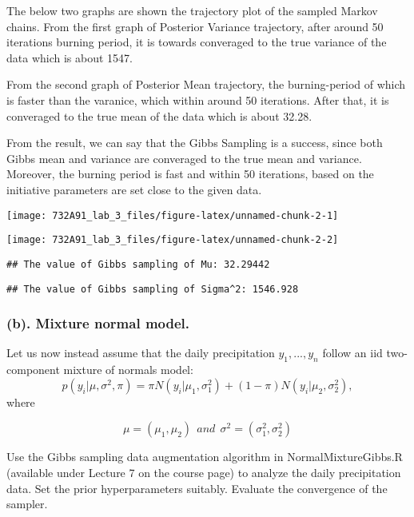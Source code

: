 \documentclass[]{article}
\begin{document}
The below two graphs are shown the trajectory plot of the sampled Markov
chains. From the first graph of Posterior Variance trajectory, after
around 50 iterations burning period, it is towards converaged to the
true variance of the data which is about 1547.

From the second graph of Posterior Mean trajectory, the burning-period
of which is faster than the varanice, which within around 50 iterations.
After that, it is converaged to the true mean of the data which is about
32.28.

From the result, we can say that the Gibbs Sampling is a success, since
both Gibbs mean and variance are converaged to the true mean and
variance. Moreover, the burning period is fast and within 50 iterations,
based on the initiative parameters are set close to the given data.

\begin{center}\texttt{[image: 732A91\_lab\_3\_files/figure-latex/unnamed-chunk-2-1]} \end{center}

\begin{center}\texttt{[image: 732A91\_lab\_3\_files/figure-latex/unnamed-chunk-2-2]} \end{center}

\begin{verbatim}
## The value of Gibbs sampling of Mu: 32.29442
\end{verbatim}

\begin{verbatim}
## The value of Gibbs sampling of Sigma^2: 1546.928
\end{verbatim}

\hypertarget{b.-mixture-normal-model.}{%
\subsubsection{(b). Mixture normal
model.}\label{b.-mixture-normal-model.}}

Let us now instead assume that the daily precipitation
\({y_1 , ..., y_n}\) follow an iid two-component mixture of normals
model:
\[p(y_i|\mu,\sigma^2, \pi) = \pi N(y_i|\mu_1, \sigma_1^2) +(1-\pi)N(y_i|\mu_2,\sigma_2^2),\]
where

\[\mu = (\mu_1, \mu_2) \ \ and\ \ \sigma^2 = (\sigma_1^2, \sigma_2^2)\]

Use the Gibbs sampling data augmentation algorithm in
NormalMixtureGibbs.R (available under Lecture 7 on the course page) to
analyze the daily precipitation data. Set the prior hyperparameters
suitably. Evaluate the convergence of the sampler.
\end{document}
